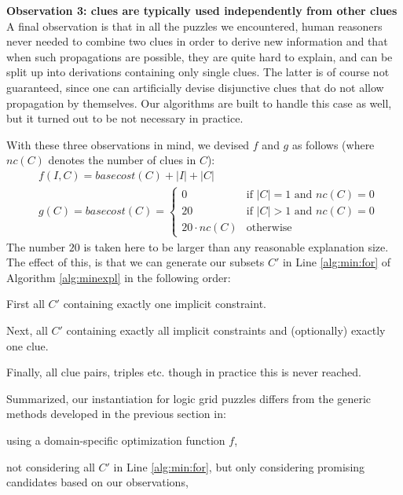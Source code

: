 \textbf{Observation 3: clues are typically used independently from other clues} 
A final observation is that in all the puzzles we encountered, human reasoners never needed to combine two clues in order to derive new information and that when such propagations are possible, they are quite hard to explain, and can be split up into derivations containing only single clues.
The latter is of course not guaranteed, since one can artificially devise disjunctive clues that do not allow propagation by themselves. 
Our algorithms are built to handle this case as well, but it turned out to be not necessary in practice. 

With these three observations in mind, we devised $f$ and $g$ as follows (where $nc(C)$ denotes the number of clues in $C$): \label{sec:cost}
\begin{align*}&f(I,C) = basecost(C) + |I| + |C|\\
&g(C) = basecost(C) = \left\{\begin{array}{ll}
                               0 & \text{if $|C|=1$ and $nc(C) = 0$}\\
                               20 & \text{if $|C|>1$ and $nc(C)=0$}\\
                               20\cdot nc(C) & \text{otherwise}
                              \end{array}\right.
                              \end{align*}
The number $20$ is taken here to be larger than any reasonable explanation size. 
The effect of this,  is that we can generate our subsets $C'$ in Line \ref{alg:min:for}
 of Algorithm \ref{alg:minexpl} in the following order:
\begin{compactitem}
 \item First all $C'$ containing exactly one implicit constraint.
 \item Next, all $C'$ containing exactly all implicit constraints and (optionally) exactly one clue.
 \item Finally, all clue pairs, triples etc. though in practice this is never reached.
\end{compactitem}
Summarized, our instantiation for logic grid puzzles differs from the generic methods developed in the previous section in:
\begin{compactitem}
 \item using a domain-specific optimization function $f$, 
 \item not considering all $C'$ in Line \ref{alg:min:for}, but only considering promising candidates based on our observations,
\end{compactitem}
